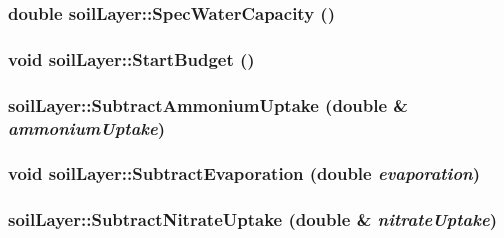 \label{classsoil_layer_a8b23d590179f5af403f95521d83aa98c}
\hypertarget{classsoil_layer_a670e17930818ea08c5ace53a25700f4a}{
\subsubsection[{SpecWaterCapacity}]{\setlength{\rightskip}{0pt plus 5cm}double soilLayer::SpecWaterCapacity ()}}
\label{classsoil_layer_a670e17930818ea08c5ace53a25700f4a}
\hypertarget{classsoil_layer_a183d7d2254081522d73ac4abf588691d}{
\subsubsection[{StartBudget}]{\setlength{\rightskip}{0pt plus 5cm}void soilLayer::StartBudget ()}}
\label{classsoil_layer_a183d7d2254081522d73ac4abf588691d}
\hypertarget{classsoil_layer_a88b301de01a73797ff3c48b11d1eef58}{
\subsubsection[{SubtractAmmoniumUptake}]{ soilLayer::SubtractAmmoniumUptake (double \& {\em ammoniumUptake})}}
\label{classsoil_layer_a88b301de01a73797ff3c48b11d1eef58}
\hypertarget{classsoil_layer_a9a38de935d6d6abe383bfd2f886559f3}{
\subsubsection[{SubtractEvaporation}]{\setlength{\rightskip}{0pt plus 5cm}void soilLayer::SubtractEvaporation (double {\em evaporation})}}
\label{classsoil_layer_a9a38de935d6d6abe383bfd2f886559f3}
\hypertarget{classsoil_layer_aa7189120b1afb35795a040acd399b179}{
\subsubsection[{SubtractNitrateUptake}]{ soilLayer::SubtractNitrateUptake (double \& {\em nitrateUptake})}}
